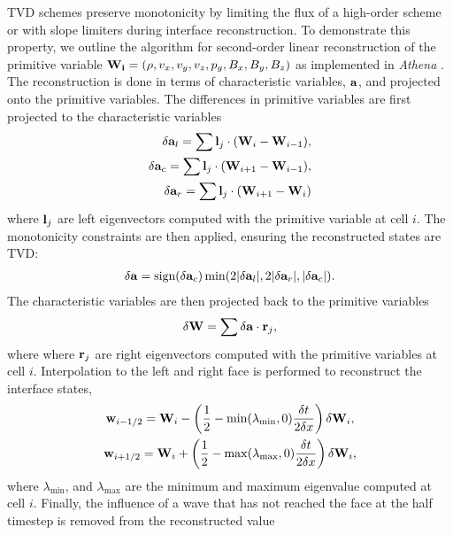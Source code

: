 TVD schemes preserve monotonicity by limiting the flux of a high-order scheme or with slope limiters during interface reconstruction.  To demonstrate this property, we outline the algorithm for second-order linear reconstruction of the primitive variable $\mathbf{W_i} = (\rho,v_x,v_y,v_z,p_g,B_x,B_y,B_z)$ as implemented in \emph{Athena} \citep{Stone:2008}.  The reconstruction is done in terms of characteristic variables, $\mathbf{a}$, and projected onto the primitive variables.  The differences in primitive variables are first projected to the characteristic variables 
\begin{gather}
\begin{split}
\delta \mathbf{a}_{l} = \sum \mathbf{l}_j \cdot (\mathbf{W}_i - \mathbf{W}_{i-1}) , \\
\delta \mathbf{a}_{c} = \sum \mathbf{l}_j \cdot (\mathbf{W}_{i+1} - \mathbf{W}_{i-1}) , \\
\delta \mathbf{a}_{r} = \sum \mathbf{l}_j \cdot (\mathbf{W}_{i+1} - \mathbf{W}_{i}) 
\end{split}
\end{gather}
where $\mathbf{l}_j$ are left eigenvectors computed with the primitive variable at cell $i$.  The monotonicity constraints are then applied, ensuring the reconstructed states are TVD:
\begin{gather}
\delta \mathbf{a} = \text{sign}(\delta \mathbf{a}_c) \min(2|\delta \mathbf{a}_l|,2|\delta \mathbf{a}_r|,|\delta \mathbf{a}_c|). 
\end{gather}
The characteristic variables are then projected back to the primitive variables
\begin{gather}
\delta \mathbf{W} = \sum \delta \mathbf{a} \cdot \mathbf{r}_j ,
\end{gather}
where where $\mathbf{r}_j$ are right eigenvectors computed with the primitive variables at cell $i$.  Interpolation to the left and right face is performed to reconstruct the interface states,
\begin{gather}
\mathbf{w}_{i-1/2} = \mathbf{W}_i - \left(\frac{1}{2} 
            - \min(\lambda_{\min},0)\frac{\delta t}{2 \delta x} \right)\delta \mathbf{W}_i , \\
\mathbf{w}_{i+1/2} = \mathbf{W}_i + \left(\frac{1}{2} 
            - \max(\lambda_{\max},0)\frac{\delta t}{2 \delta x} \right)\delta \mathbf{W}_i , 
\end{gather}
where $\lambda_{\min}$, and $\lambda_{\max}$ are the minimum and maximum eigenvalue computed at cell $i$.  Finally, the influence of a wave that has not reached the face at the half timestep is removed from the reconstructed value
